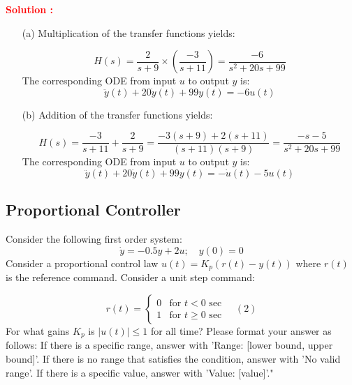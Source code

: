 \documentclass[12pt]{article}
\begin{document}
\textbf{\textcolor{red}{Solution :}} 
\begin{enumerate}
    \item[(a)] Multiplication of the transfer functions yields:

    \begin{equation}
    H(s) = \frac{2}{s + 9} \times \left(\frac{-3}{s + 11}\right) = \frac{-6}{s^2 + 20s + 99}
    \end{equation}
    The corresponding ODE from input \(u\) to output \(y\) is:
    \begin{equation}
    \ddot{y}(t) + 20\dot{y}(t) + 99y(t) = -6u(t)
    \end{equation}
    

    \item[(b)] Addition of the transfer functions yields:


    \begin{equation}
    H(s) = \frac{-3}{s + 11} + \frac{2}{s + 9} = \frac{-3(s + 9) + 2(s + 11)}{(s + 11)(s + 9)} = \frac{-s - 5}{s^2 + 20s + 99}
    \end{equation}
    The corresponding ODE from input \(u\) to output \(y\) is:
    \begin{equation}
    \ddot{y}(t) + 20\dot{y}(t) + 99y(t) = -\dot{u}(t) - 5u(t)
    \end{equation}
\end{enumerate}

\clearpage

\subsection{Proportional Controller}

Consider the following first order system:
\begin{equation}
\dot{y} = -0.5y + 2u; \quad y(0) = 0
\end{equation}
Consider a proportional control law \(u(t) = K_p(r(t) - y(t))\) where \(r(t)\) is the reference command. Consider a unit step command:

    \[ r(t) =
    \begin{cases} 
    0 & \text{for } t < 0 \text{ sec} \\
    1 & \text{for } t \geq 0 \text{ sec}
    \end{cases}
    \quad (2)
    \]
For what gains \(K_p\) is \(\lvert u(t) \rvert \leq 1\) for all time?
Please format your answer as follows: 
If there is a specific range, answer with 'Range: [lower bound, upper bound]'.
If there is no range that satisfies the condition, answer with 'No valid range'.
If there is a specific value, answer with 'Value: [value]'."
\end{document}
